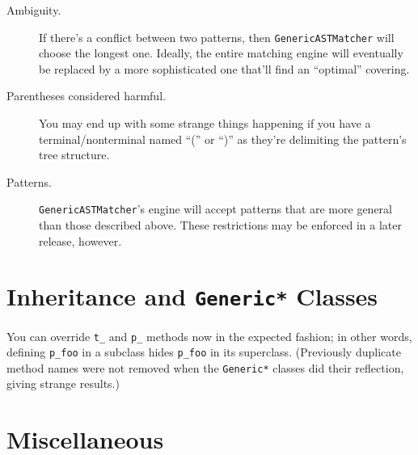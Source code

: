 \documentclass{article}
\newcommand{\code}[1]{\texttt{#1}}
\begin{document}
\begin{description}

\item[Ambiguity.] If there's a conflict between two patterns, then
	\code{GenericASTMatcher} will choose the longest one.  Ideally,
	the entire matching engine will eventually be replaced by a more
	sophisticated one that'll find an ``optimal'' covering.

\item[Parentheses considered harmful.] You may end up with some strange
	things happening if you have a terminal/nonterminal named ``(''
	or ``)'' as they're delimiting the pattern's tree structure.

\item[Patterns.] \code{GenericASTMatcher}'s engine will accept patterns
	that are more general than those described above.  These restrictions
	may be enforced in a later release, however.

\end{description}

\section{Inheritance and \code{Generic*} Classes}

You can override \code{t\_} and \code{p\_} methods now in the expected fashion;
in other words, defining \code{p\_foo} in a subclass hides \code{p\_foo} in
its superclass.  (Previously duplicate method names were not removed when
the \code{Generic*} classes did their reflection, giving strange results.)

\section{Miscellaneous}
\end{document}
